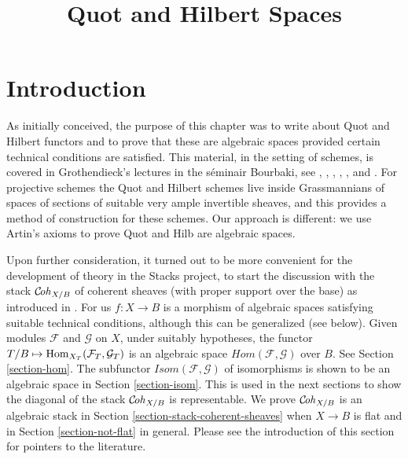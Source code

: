 

%


\title{Quot and Hilbert Spaces}

\maketitle

\label{section-phantom}

\tableofcontents




\section{Introduction}
\label{section-introduction}

\noindent
As initially conceived, the purpose of this chapter was to write about
Quot and Hilbert functors and to prove that these are algebraic spaces
provided certain technical conditions are satisfied. This material, in
the setting of schemes, is
covered in Grothendieck's lectures in the s\'eminair Bourbaki, see
\cite{Gr-I},
\cite{Gr-II},
\cite{Gr-III},
\cite{Gr-IV},
\cite{Gr-V}, and
\cite{Gr-VI}. For projective schemes the Quot and Hilbert schemes
live inside Grassmannians of spaces of sections of suitable very
ample invertible sheaves, and this provides a method of construction
for these schemes. Our approach is different: we use Artin's axioms to
prove Quot and Hilb are algebraic spaces.

\medskip\noindent
Upon further consideration, it turned out to be more convenient for
the development of theory in the Stacks project, to start the
discussion with the stack $\mathcal{C}\!\mathit{oh}_{X/B}$
of coherent sheaves (with proper support over the base)
as introduced in \cite{lieblich_remarks}. For us $f : X \to B$
is a morphism of algebraic spaces satisfying suitable
technical conditions, although this can be generalized (see below).
Given modules $\mathcal{F}$ and $\mathcal{G}$
on $X$, under suitably hypotheses, the functor
$T/B \mapsto \mathop{\mathrm{Hom}}\nolimits_{X_T}(\mathcal{F}_T, \mathcal{G}_T)$
is an algebraic space $\mathit{Hom}(\mathcal{F}, \mathcal{G})$
over $B$. See Section \ref{section-hom}. The subfunctor
$\mathit{Isom}(\mathcal{F}, \mathcal{G})$ of isomorphisms is
shown to be an algebraic space in Section \ref{section-isom}.
This is used in the next sections to show the diagonal of
the stack $\mathcal{C}\!\mathit{oh}_{X/B}$ is representable. We prove
$\mathcal{C}\!\mathit{oh}_{X/B}$ is an algebraic stack in
Section \ref{section-stack-coherent-sheaves} when $X \to B$ is flat
and in Section \ref{section-not-flat} in general.
Please see the introduction of this section for pointers
to the literature.

